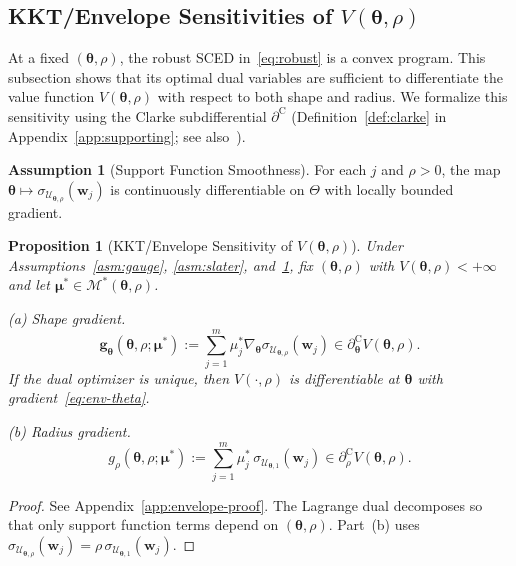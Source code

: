 \documentclass[11pt]{article}
\newcommand{\cU}{\mathcal{U}}
\newcommand{\cM}{\mathcal{M}}
\newcommand{\btheta}{\bm{\theta}}
\newcommand{\bmu}{\bm{\mu}}
\newcommand{\bw}{\bm{w}}
\newcommand{\bg}{\bm{g}}
\newcommand{\clsubd}{\partial^{\mathrm{C}}}
\newtheorem{proposition}[theorem]{Proposition}
\theoremstyle{definition}
\newtheorem{assumption}{Assumption}
\begin{document}
\subsection{KKT/Envelope Sensitivities of \texorpdfstring{$V(\btheta,\rho)$}{V(theta, rho)}}

At a fixed $(\btheta,\rho)$, the robust SCED in~\eqref{eq:robust} is a convex program. This subsection shows that its optimal dual variables are sufficient to differentiate the value function $V(\btheta,\rho)$ with respect to both shape and radius. We formalize this sensitivity using the Clarke subdifferential $\clsubd$ (Definition~\ref{def:clarke} in Appendix~\ref{app:supporting}; see also~\citet{clarke1990optimization}).

\begin{assumption}[Support Function Smoothness]\label{asm:sigma-diff}
For each $j$ and $\rho>0$, the map $\btheta\mapsto \sigma_{\cU_{\btheta,\rho}}(\bw_j)$ is continuously differentiable on $\Theta$ with locally bounded gradient.
\end{assumption}

\begin{proposition}[KKT/Envelope Sensitivity of $V(\btheta,\rho)$]\label{thm:envelope}
Under Assumptions~\ref{asm:gauge}, \ref{asm:slater}, and~\ref{asm:sigma-diff}, fix $(\btheta,\rho)$ with $V(\btheta,\rho)<+\infty$ and let $\bmu^*\in\cM^*(\btheta,\rho)$.

\emph{(a) Shape gradient.}
\begin{equation}\label{eq:env-theta}
\bg_{\btheta}(\btheta,\rho;\bmu^*) := \sum_{j=1}^m \mu_j^* \nabla_{\btheta} \sigma_{\cU_{\btheta,\rho}}(\bw_j) \in \clsubd_{\btheta} V(\btheta,\rho).
\end{equation}
If the dual optimizer is unique, then $V(\cdot,\rho)$ is differentiable at $\btheta$ with gradient~\eqref{eq:env-theta}.

\emph{(b) Radius gradient.}
\begin{equation}\label{eq:env-rho}
g_{\rho}(\btheta,\rho;\bmu^*) := \sum_{j=1}^m \mu_j^*\,\sigma_{\cU_{\btheta,1}}(\bw_j) \in \clsubd_{\rho}V(\btheta,\rho).
\end{equation}
\end{proposition}

\begin{proof}
See Appendix~\ref{app:envelope-proof}. The Lagrange dual decomposes so that only support function terms depend on $(\btheta,\rho)$. Part~(b) uses $\sigma_{\cU_{\btheta,\rho}}(\bw_j)=\rho\,\sigma_{\cU_{\btheta,1}}(\bw_j)$.
\end{proof}
\end{document}
